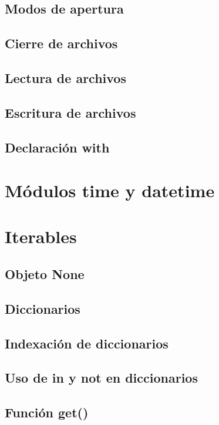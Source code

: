 \documentclass{article}
\begin{document}
\subsection{Modos de apertura}

\subsection{Cierre de archivos}

\subsection{Lectura de archivos}

\subsection{Escritura de archivos}

\subsection{Declaración with}

\section{Módulos time y datetime}

\section{Iterables}

\subsection{Objeto None}

\subsection{Diccionarios}

\subsection{Indexación de diccionarios}

\subsection{Uso de in y not en diccionarios}

\subsection{Función get()}
\end{document}
